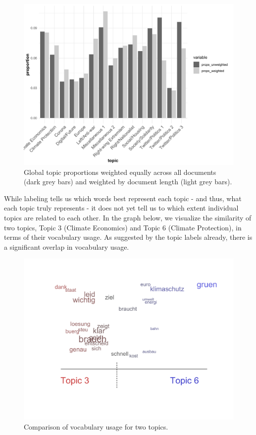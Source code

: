 \begin{figure}[h!]
  \centering
  \captionsetup{justification=centering,margin=2cm}
  \includegraphics[scale = 0.5]{../plots/4_3/global_thetas.pdf}
  \caption{Global topic proportions weighted equally across all documents (dark grey bars) and weighted by document length (light grey bars).}
  \label{fig:global_thetas}
\end{figure}

While labeling tells us which words best represent each topic - and thus, what each topic truly represents - it does not yet tell us to which extent individual topics are related to each other. In the graph below, we visualize the similarity of two topics, Topic 3 (Climate Economics) and Topic 6 (Climate Protection), in terms of their vocabulary usage. As suggested by the topic labels already, there is a significant overlap in vocabulary usage.

\begin{figure}[h!]
  \centering
  \captionsetup{justification=centering,margin=2cm}
  \includegraphics[scale = 0.5]{../plots/4_3/vocabulary_comparison.pdf}
  \caption{Comparison of vocabulary usage for two topics.}
  \label{fig:vocabulary_comparison}
\end{figure}

